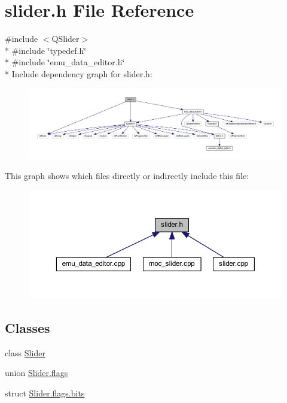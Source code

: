 \hypertarget{a00025}{\section{slider.\+h File Reference}
\label{a00025}
}
{\ttfamily \#include $<$Q\+Slider$>$}\\*
{\ttfamily \#include \char`\"{}typedef.\+h\char`\"{}}\\*
{\ttfamily \#include \char`\"{}emu\+\_\+data\+\_\+editor.\+h\char`\"{}}\\*
Include dependency graph for slider.\+h\+:
\nopagebreak
\begin{figure}[H]
\begin{center}
\leavevmode
\includegraphics[width=350pt]{d1/d72/a00204}
\end{center}
\end{figure}
This graph shows which files directly or indirectly include this file\+:
\nopagebreak
\begin{figure}[H]
\begin{center}
\leavevmode
\includegraphics[width=350pt]{d5/d13/a00205}
\end{center}
\end{figure}
\subsection*{Classes}
\begin{DoxyCompactItemize}
\item 
class \hyperlink{a00024}{Slider}
\item 
union \hyperlink{a00025_d7/d12/a00126}{Slider.\+flags}
\item 
struct \hyperlink{a00025_df/dcd/a00127}{Slider.\+flags.\+bits}
\end{DoxyCompactItemize}
